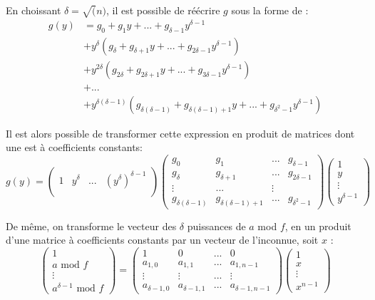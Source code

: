 \documentclass[a4paper]{article}
\begin{document}
En choissant $\delta = \sqrt(n)$, il est possible de réécrire $g$ sous la forme de :
\begin{align*}
    g(y) &= g_0 + g_1y + ... + g_{\delta-1}y^{\delta-1} \\
        &+ y^\delta(g_\delta + g_{\delta+1}y + ... + g_{2\delta-1}y^{\delta-1}) \\
                                      &+ y^{2\delta}(g_{2\delta} + g_{2\delta+1}y + ... + g_{3\delta-1}y^{\delta-1}) \\
                                      &+ ... \\
                                      &+ y^{\delta(\delta-1)}(g_{\delta(\delta-1)} + g_{\delta(\delta-1)+1}y + ... + g_{\delta^2-1}y^{\delta-1}) 
\end{align*}

Il est alors possible de transformer cette expression en produit de matrices dont une est à coefficients constants:
\[
g(y) = 
\begin{pmatrix}
    1 & y^\delta & ... & (y^\delta)^{\delta-1}  \\  
\end{pmatrix}
\begin{pmatrix}
    g_0 & g_1 & ... & g_{\delta-1} \\
    g_{\delta} & g_{\delta+1} & ... & g_{2\delta-1} \\
    \vdots & ... & \vdots \\
    g_{\delta(\delta-1)} & g_{\delta(\delta-1)+1} & ... & g_{\delta^2-1}
\end{pmatrix}
\begin{pmatrix}
    1 \\
    y \\
    \vdots \\
    y^{\delta-1}
\end{pmatrix}
\]

De même, on transforme le vecteur des $\delta$ puissances de $a$ mod $f$, en un produit d'une matrice à coefficients constants par un vecteur de l'inconnue, soit $x$ :
\[
    \begin{pmatrix}
        1 \\
        a \text{ mod }f\\
        \vdots \\
        a^{\delta-1} \text{ mod }f
    \end{pmatrix}
    =
    \begin{pmatrix}
        1 & 0 & ... & 0 \\
        a_{1,0} & a_{1,1} & ... & a_{1,n-1} \\
        \vdots & \vdots & ... & \vdots \\
        a_{\delta-1,0} & a_{\delta-1,1} & ... & a_{\delta-1,n-1}
    \end{pmatrix}
    \begin{pmatrix}
        1 \\
        x \\
        \vdots \\
        x^{n-1}
    \end{pmatrix}
\]
\end{document}
